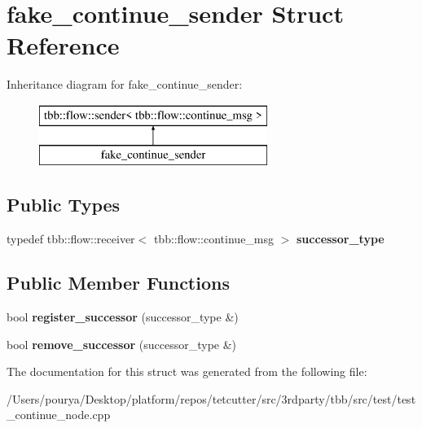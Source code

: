 \hypertarget{structfake__continue__sender}{}\section{fake\+\_\+continue\+\_\+sender Struct Reference}
\label{structfake__continue__sender}
Inheritance diagram for fake\+\_\+continue\+\_\+sender\+:\begin{figure}[H]
\begin{center}
\leavevmode
\includegraphics[height=2.000000cm]{structfake__continue__sender}
\end{center}
\end{figure}
\subsection*{Public Types}
\begin{DoxyCompactItemize}
\item 
\hypertarget{structfake__continue__sender_a230f649374289bc532e064d6522b8e95}{}typedef tbb\+::flow\+::receiver$<$ tbb\+::flow\+::continue\+\_\+msg $>$ {\bfseries successor\+\_\+type}\label{structfake__continue__sender_a230f649374289bc532e064d6522b8e95}

\end{DoxyCompactItemize}
\subsection*{Public Member Functions}
\begin{DoxyCompactItemize}
\item 
\hypertarget{structfake__continue__sender_a33c41cc67094091aa68c2b5e7b68cf0c}{}bool {\bfseries register\+\_\+successor} (successor\+\_\+type \&)\label{structfake__continue__sender_a33c41cc67094091aa68c2b5e7b68cf0c}

\item 
\hypertarget{structfake__continue__sender_af32603d790d1fb5060ff17bdd354c244}{}bool {\bfseries remove\+\_\+successor} (successor\+\_\+type \&)\label{structfake__continue__sender_af32603d790d1fb5060ff17bdd354c244}

\end{DoxyCompactItemize}


The documentation for this struct was generated from the following file\+:\begin{DoxyCompactItemize}
\item 
/\+Users/pourya/\+Desktop/platform/repos/tetcutter/src/3rdparty/tbb/src/test/test\+\_\+continue\+\_\+node.\+cpp\end{DoxyCompactItemize}
